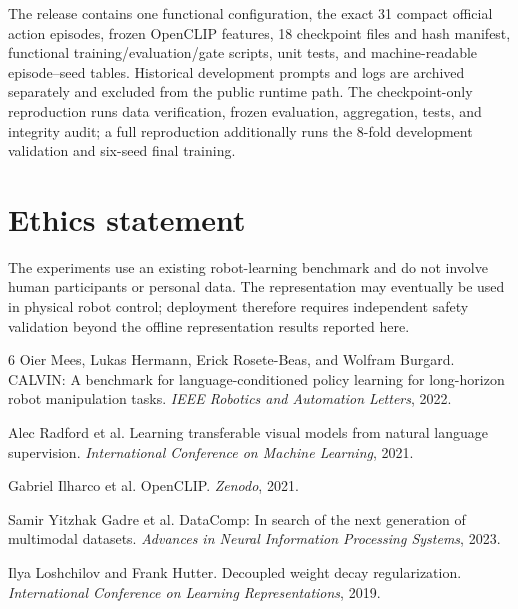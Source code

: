 \documentclass{article}
\begin{document}
The release contains one functional configuration, the exact 31 compact
official action episodes, frozen OpenCLIP features, 18 checkpoint files and
hash manifest, functional training/evaluation/gate scripts, unit tests, and
machine-readable episode--seed tables.  Historical development prompts and
logs are archived separately and excluded from the public runtime path.  The
checkpoint-only reproduction runs data verification, frozen evaluation,
aggregation, tests, and integrity audit; a full reproduction additionally runs
the 8-fold development validation and six-seed final training.

\section*{Ethics statement}

The experiments use an existing robot-learning benchmark and do not involve
human participants or personal data.  The representation may eventually be
used in physical robot control; deployment therefore requires independent
safety validation beyond the offline representation results reported here.


\begin{thebibliography}{6}
Oier Mees, Lukas Hermann, Erick Rosete-Beas, and Wolfram Burgard.
CALVIN: A benchmark for language-conditioned policy learning for long-horizon robot manipulation tasks.
\emph{IEEE Robotics and Automation Letters}, 2022.

Alec Radford et al.
Learning transferable visual models from natural language supervision.
\emph{International Conference on Machine Learning}, 2021.

Gabriel Ilharco et al.
OpenCLIP.
\emph{Zenodo}, 2021.

Samir Yitzhak Gadre et al.
DataComp: In search of the next generation of multimodal datasets.
\emph{Advances in Neural Information Processing Systems}, 2023.

Ilya Loshchilov and Frank Hutter.
Decoupled weight decay regularization.
\emph{International Conference on Learning Representations}, 2019.
\end{thebibliography}
\end{document}
